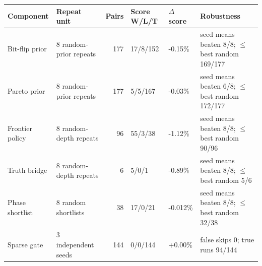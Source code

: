 \begin{tabularx}{\linewidth}{@{}llrllX@{}}
\toprule
Component & Repeat unit & Pairs & Score W/L/T & $\Delta$ score & Robustness \\
\midrule
Bit-flip prior & 8 random-prior repeats & 177 & 17/8/152 & -0.15\% & seed means beaten 8/8; $\leq$ best random 169/177 \\
Pareto prior & 8 random-prior repeats & 177 & 5/5/167 & -0.03\% & seed means beaten 6/8; $\leq$ best random 172/177 \\
Frontier policy & 8 random-depth repeats & 96 & 55/3/38 & -1.12\% & seed means beaten 8/8; $\leq$ best random 90/96 \\
Truth bridge & 8 random-depth repeats & 6 & 5/0/1 & -0.89\% & seed means beaten 8/8; $\leq$ best random 5/6 \\
Phase shortlist & 8 random shortlists & 38 & 17/0/21 & -0.012\% & seed means beaten 8/8; $\leq$ best random 32/38 \\
Sparse gate & 3 independent seeds & 144 & 0/0/144 & +0.00\% & false skips 0; true runs 94/144 \\
\bottomrule
\end{tabularx}

